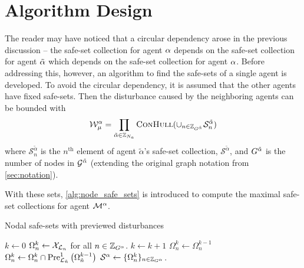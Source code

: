 \section{Algorithm Design}
The reader may have noticed that a circular dependency arose in the previous discussion -- the safe-set collection for agent $\alpha$ depends on the safe-set collection for agent ${\tilde{\alpha}}$ which depends on the safe-set collection for agent $\alpha$. Before addressing this, however, an algorithm to find the safe-sets of a single agent is developed. To avoid the circular dependency, it is assumed that the other agents have fixed safe-sets. Then the disturbance caused by the neighboring agents can be bounded with
\begin{equation}
\wcon[\agentidx][\modeidx]=\prod_{\tilde{\agentidx}\in\idxset{\numagents}}\Call{ConHull}{\cup_{n\in\idxset{\gnumnodes[\tilde{\agentidx}]}}\mathcal{S}^{\tilde{\agentidx}}_n}
\end{equation}
where $\mathcal{S}^{\tilde\alpha}_n$ is the $n^{\text{th}}$ element of agent $\tilde\alpha$'s safe-set collection, $\mathcal{S}^{\tilde\alpha}$, and $\gnumnodes[{\tilde\alpha}]$ is the number of nodes in $\mathcal{G}^{\tilde\alpha}$ (extending the original graph notation from \autoref{sec:notation}).

With these sets, \autoref{alg:node_safe_sets} is introduced to compute the maximal safe-set collections for agent $\mathcal{M}^{\alpha}$. 
\begin{algorithm}[h]
\caption{Nodal safe-sets with previewed disturbances}\label{alg:node_safe_sets}
\begin{algorithmic}[1]
\State $k\gets0$
\State $\Omega_{n}^k\gets\xcon[\gnodelabel{n}]$ for all $n\in\idxset{\gnumnodes[\agentidx]}$.
\Repeat 
	\State $k\gets k+1$
		\State $\Omega_{n}^k\gets\Omega_{n}^{k-1}$
				\State $\Omega_{n}^k\gets\Omega_{n}^k\cap\PreviewedPre[\gnodelabel{\tilde{n}}][1]{\Omega_{\tilde{n}}^{k-1}}$
			\EndFor
	\EndFor
{}
\State $\safeset{}^\agentidx\gets\{\Omega_{n}^k\}_{n\in\idxset{\gnumnodes[\agentidx]}}$.\;
\EndProcedure
\end{algorithmic}
\end{algorithm}


